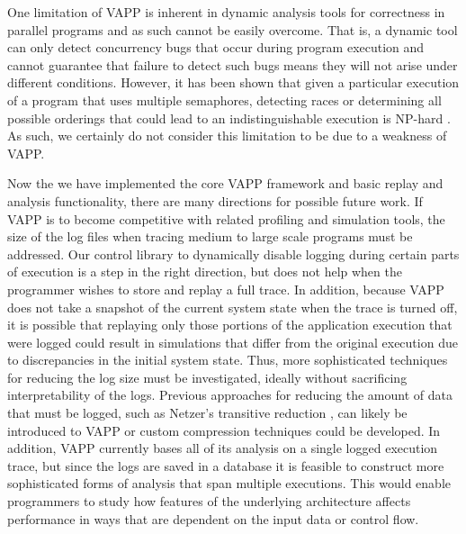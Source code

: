 One limitation of VAPP is inherent in
dynamic analysis tools for correctness in parallel programs and
as such cannot be easily overcome.  That is, a dynamic tool
can only detect concurrency bugs that occur during program
execution and cannot guarantee that failure to detect such
bugs means they will not arise under different conditions.
However, it has been shown that given a particular
execution of a program that uses multiple semaphores,
detecting races or determining all possible orderings that could
lead to an indistinguishable execution is NP-hard
\cite{netzer1990complexity}.  As such, we certainly do not consider
this limitation to be due to a weakness of VAPP.

Now the we have implemented the core VAPP framework and basic
replay and analysis functionality, there are many directions
for possible future work.  If VAPP is to become competitive
with related profiling and simulation tools, the size of the
log files when tracing medium to large scale programs must be
addressed.  Our control library to dynamically disable logging
during certain parts of execution is a step in the right direction,
but does not help when the programmer wishes to store and replay
a full trace.  In addition, because VAPP does not take a snapshot
of the current system state when the trace is turned off, it is
possible that replaying only those portions of the application
execution that were logged could result in simulations that differ
from the original execution due to discrepancies in the initial
system state.  Thus, more sophisticated techniques for reducing
the log size must be investigated, ideally without sacrificing
interpretability of the logs.
Previous approaches for reducing the amount
of data that must be logged, such as Netzer's transitive
reduction \cite{netzer1993optimal}, can likely be introduced to
VAPP or custom compression techniques could be developed.  In addition,
VAPP currently bases all of its analysis on a single logged
execution trace, but since the logs are saved in a database it is feasible
to construct more sophisticated forms of analysis that span multiple
executions.  This would enable programmers to study how features
of the underlying architecture affects performance in ways that
are dependent on the input data or control flow.

